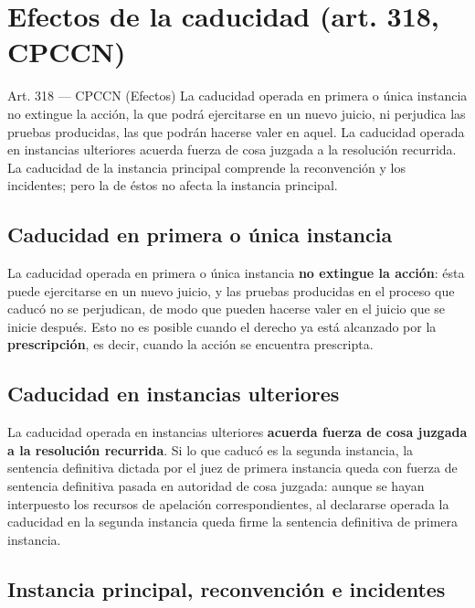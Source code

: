 \documentclass[12pt,oneside]{book}
\begin{document}
\section{Efectos de la caducidad (art. 318, CPCCN)}

\begin{articulo}{Art. 318 --- CPCCN (Efectos)}
La caducidad operada en primera o única instancia no extingue la acción, la que podrá ejercitarse en un nuevo juicio, ni perjudica las pruebas producidas, las que podrán hacerse valer en aquel. La caducidad operada en instancias ulteriores acuerda fuerza de cosa juzgada a la resolución recurrida. La caducidad de la instancia principal comprende la reconvención y los incidentes; pero la de éstos no afecta la instancia principal.
\end{articulo}

\subsection{Caducidad en primera o única instancia}

La caducidad operada en primera o única instancia \textbf{no extingue la acción}: ésta puede ejercitarse en un nuevo juicio, y las pruebas producidas en el proceso que caducó no se perjudican, de modo que pueden hacerse valer en el juicio que se inicie después. Esto no es posible cuando el derecho ya está alcanzado por la \textbf{prescripción}, es decir, cuando la acción se encuentra prescripta.

\subsection{Caducidad en instancias ulteriores}

La caducidad operada en instancias ulteriores \textbf{acuerda fuerza de cosa juzgada a la resolución recurrida}. Si lo que caducó es la segunda instancia, la sentencia definitiva dictada por el juez de primera instancia queda con fuerza de sentencia definitiva pasada en autoridad de cosa juzgada: aunque se hayan interpuesto los recursos de apelación correspondientes, al declararse operada la caducidad en la segunda instancia queda firme la sentencia definitiva de primera instancia.

\subsection{Instancia principal, reconvención e incidentes}
\end{document}
